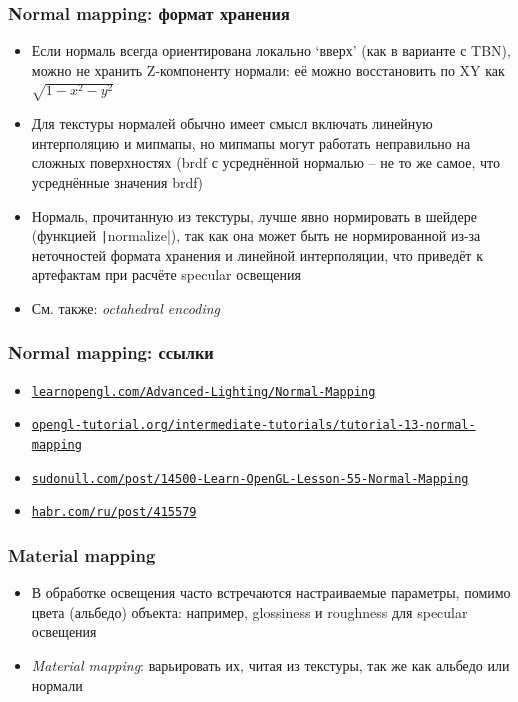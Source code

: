\documentclass[10pt]{beamer}
\begin{document}
\begin{frame}[fragile]
\frametitle{Normal mapping: формат хранения}
\fontsize{10pt}{10pt}
\begin{itemize}
\item Если нормаль всегда ориентирована локально `вверх' (как в варианте с TBN), можно не хранить Z-компоненту нормали: её можно восстановить по XY как \begin{math}\sqrt{1-x^2-y^2}\end{math}
\pause
\item Для текстуры нормалей обычно имеет смысл включать линейную интерполяцию и мипмапы, но мипмапы могут работать неправильно на сложных поверхностях (brdf с усреднённой нормалью -- не то же самое, что усреднённые значения brdf)
\pause
\item Нормаль, прочитанную из текстуры, лучше явно нормировать в шейдере (функцией \texttt|normalize|), так как она может быть не нормированной из-за неточностей формата хранения и линейной интерполяции, что приведёт к артефактам при расчёте specular освещения
\pause
\item См. также: \textit{octahedral encoding}
\end{itemize}
\end{frame}

\begin{frame}[fragile]
\frametitle{Normal mapping: ссылки}
\begin{itemize}
\item \href{https://learnopengl.com/Advanced-Lighting/Normal-Mapping}{\texttt{learnopengl.com/Advanced-Lighting/Normal-Mapping}}
\item \href{http://www.opengl-tutorial.org/intermediate-tutorials/tutorial-13-normal-mapping}{\texttt{opengl-tutorial.org/intermediate-tutorials/tutorial-13-normal-mapping}}
\item \href{https://sudonull.com/post/14500-Learn-OpenGL-Lesson-55-Normal-Mapping}{\texttt{sudonull.com/post/14500-Learn-OpenGL-Lesson-55-Normal-Mapping}}
\item \href{https://habr.com/ru/post/415579}{\texttt{habr.com/ru/post/415579}}
\end{itemize}
\end{frame}

\begin{frame}[fragile]
\frametitle{Material mapping}
\begin{itemize}
\item В обработке освещения часто встречаются настраиваемые параметры, помимо цвета (альбедо) объекта: например, glossiness и roughness для specular освещения
\pause
\item \textit{Material mapping}: варьировать их, читая из текстуры, так же как альбедо или нормали
\end{itemize}
\end{frame}
\end{document}
